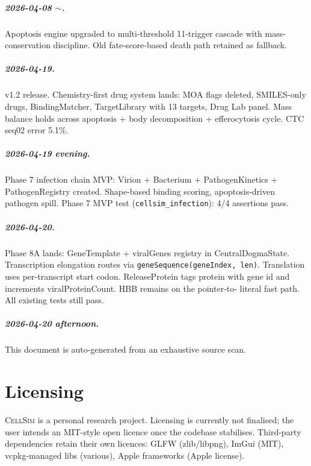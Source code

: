 \documentclass[11pt,letterpaper,twoside,openany]{book}
\newcommand{\code}[1]{\texttt{#1}}
\begin{document}
\paragraph{2026-04-08 $\sim$.} Apoptosis engine upgraded to
multi-threshold 11-trigger cascade with mass-conservation
discipline. Old fate-score-based death path retained as fallback.

\paragraph{2026-04-19.} v1.2 release. Chemistry-first drug system
lands: MOA flags deleted, SMILES-only drugs, BindingMatcher,
TargetLibrary with 13 targets, Drug Lab panel. Mass balance holds
across apoptosis + body decomposition + efferocytosis cycle. CTC
seq02 error 5.1\%.

\paragraph{2026-04-19 evening.} Phase 7 infection chain MVP:
Virion + Bacterium + PathogenKinetics + PathogenRegistry created.
Shape-based binding scoring, apoptosis-driven pathogen spill.
Phase 7 MVP test (\code{cellsim\_infection}): 4/4 assertions pass.

\paragraph{2026-04-20.} Phase 8A lands: GeneTemplate +
viralGenes registry in CentralDogmaState. Transcription elongation
routes via \code{geneSequence(geneIndex, len)}. Translation uses
per-transcript start codon. ReleaseProtein tags protein with gene
id and increments viralProteinCount. HBB remains on the pointer-to-
literal fast path. All existing tests still pass.

\paragraph{2026-04-20 afternoon.} This document is auto-generated
from an exhaustive source scan.

\chapter{Licensing}
\label{ch:license}

\textsc{CellSim} is a personal research project. Licensing is
currently not finalised; the user intends an MIT-style open licence
once the codebase stabilises. Third-party dependencies retain their
own licences: GLFW (zlib/libpng), ImGui (MIT), vcpkg-managed libs
(various), Apple frameworks (Apple license).
\end{document}
